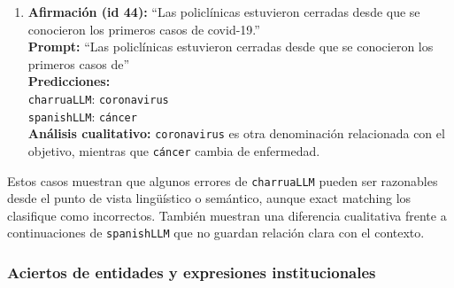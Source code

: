 \documentclass[11pt,a4paper]{article}
\newcommand{\charrua}{\texttt{charruaLLM}}
\newcommand{\spanishmodel}{\texttt{spanishLLM}}
\newcommand{\code}[1]{\texttt{#1}}
\begin{document}
\begin{enumerate}[leftmargin=*, itemsep=0.9em]
    \item \textbf{Afirmación (id 44):} ``Las policlínicas estuvieron cerradas
          desde que se conocieron los primeros casos de covid-19.''\\
          \textbf{Prompt:} ``Las policlínicas estuvieron cerradas desde que se
          conocieron los primeros casos de''\\
          \textbf{Predicciones:}\\
          \hspace*{1em}\charrua{}: \code{coronavirus}\\
          \hspace*{1em}\spanishmodel{}: \code{cáncer}\\
          \textbf{Análisis cualitativo:} \code{coronavirus} es otra
          denominación relacionada con el objetivo, mientras que \code{cáncer}
          cambia de enfermedad.
\end{enumerate}

Estos casos muestran que algunos errores de \charrua{} pueden ser razonables
desde el punto de vista lingüístico o semántico, aunque exact matching los
clasifique como incorrectos. También muestran una diferencia cualitativa frente
a continuaciones de \spanishmodel{} que no guardan relación clara con el contexto.

\subsubsection{Aciertos de entidades y expresiones institucionales}
\end{document}
